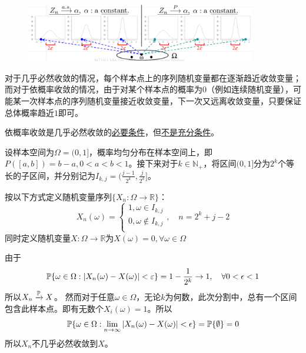 \begin{figure}[h]
    \centering
    \includegraphics[width=0.9\textwidth]{image/converge1.png}
\end{figure}

对于几乎必然收敛的情况，每个样本点上的序列随机变量都在逐渐趋近收敛变量；而对于依概率收敛的情况，由于对某个样本点的概率为0（例如连续随机变量），可能某一次样本点的序列随机变量接近收敛变量，下一次又远离收敛变量，只要保证总体概率趋近$1$即可。

\begin{proposition}
    依概率收敛是几乎必然收敛的\underline{必要条件}，但\underline{不是充分条件}。
\end{proposition}

\begin{example}[依概率收敛而不几乎必然收敛]
    设样本空间为$\Omega =(0,1]$，概率均匀分布在样本空间上，即$P([a,b])=b-a,0<a<b<1$。接下来对于$k \in \mathbb{N}_+$，将区间$(0,1]$分为$2^{k}$个等长的子区间，并分别记为$I_{k,j}=(\frac{j-1}{2^k},\frac{j}{2^k}]$。

    按以下方式定义随机变量序列$\{ X_n: \Omega \to \mathbb{R} \}$：
    \[ X_n(\omega)=\begin{cases}
            1, \omega \in I_{k,j}    \\
            0, \omega \notin I_{k,j} \\
        \end{cases} ,\quad n = 2^k+j-2\]
    同时定义随机变量$X: \Omega \to \mathbb{R}$为$X(\omega)=0,\forall \omega \in \Omega$

    由于
    \[ \P\{\omega \in \Omega: \abs{X_n(\omega) - X(\omega)}<\e\}=1-\frac{1}{2^k} \to 1 ,\quad \forall 0<\epsilon<1 \]
    所以$X_n \xrightarrow{\P} X$。
    然而对于任意$\omega \in \Omega$，无论$k$为何数，此次分割中，总有一个区间包含此样本点。即有无数个$X_i(\omega) = 1$。所以
    \[ \P\{ \omega \in \Omega: \lim_{n \to \infty}\abs{ X_n(\omega) - X(\omega)} < \epsilon \} =\P\{\emptyset \}=0 \]
    所以$X_n$不几乎必然收敛到$X$。
\end{example}

